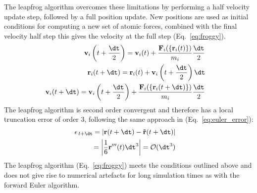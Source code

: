 The leapfrog algorithm overcomes these limitations by performing a half velocity update step, followed by a full position update. New positions are used as initial conditions for computing a new set of atomic forces, combined with the final velocity half step this gives the velocity at the full step (Eq.~\ref{eq:froggy}).  
\begin{subequations} \label{eq:froggy}
\begin{align}
\begin{split}
\mathbf{v}_{i} \left(t + \frac{\dt}{2}\right) &= \textbf{v}_{i} (t) + \frac{\mathbf{F}_i(\{\mathbf{r}_i(t)\})}{m_i}\frac{\dt}{2} 
\end{split}\\
\begin{split}
\mathbf{r}_{i} (t + \dt) &= \mathbf{r}_{i} (t) + \mathbf{v}_{i} \left(t + \frac{\dt}{2}\right)\dt
\end{split}\\
\begin{split}
\mathbf{v}_{i} (t + \dt) &= \textbf{v}_{i} \left(t + \frac{\dt}{2}\right) + \frac{\mathbf{F}_i(\{\mathbf{r}_i(t+\dt)\})}{m_i}\frac{\dt}{2}
\end{split}
\end{align}
\end{subequations}
The leapfrog algorithm is second order convergent and therefore has a local truncation error of order 3, following the same approach in (Eq.~\ref{eq:euler_error}):
\begin{subequations} \label{eq:froggy_error}
\begin{align}
\begin{split}
    \epsilon_{\,t+\dt} &= \left|\mathbf{r}(t+\dt) - \mathbf{\tilde{r}}(t+\dt)\right|
\end{split}\\
\begin{split}
    &= \left| \frac{1}{6} \mathbf{r'''}(t)\dt^3 \right| = \mathcal{O}(\dt^3)
\end{split}
\end{align}
\end{subequations}
The leapfrog algorithm (Eq.~\ref{eq:froggy}) meets the conditions outlined above and does not give rise to numerical artefacts for long simulation times as with the forward Euler algorithm. 

